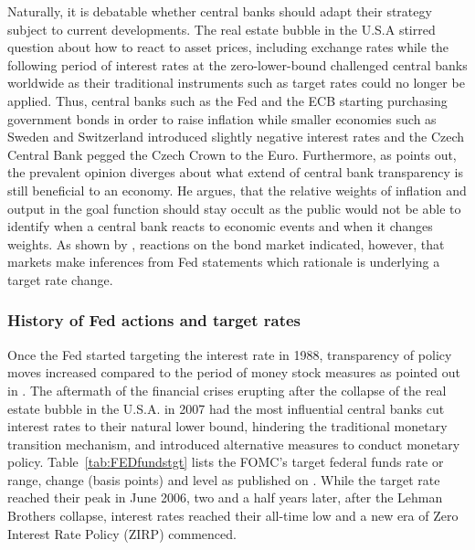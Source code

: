 Naturally, it is debatable whether central banks should adapt their strategy subject to current developments. The real estate bubble in the U.S.A stirred question about how to react to asset prices, including exchange rates while the following period of interest rates at the zero-lower-bound challenged central banks worldwide as their traditional instruments such as target rates could no longer be applied. Thus, central banks such as the Fed and the ECB starting purchasing government bonds in order to raise inflation while smaller economies such as Sweden and Switzerland introduced slightly negative interest rates and the Czech Central Bank pegged the Czech Crown to the Euro. Furthermore, as \textcite{Mishkin.2007} points out, the prevalent opinion diverges about what extend of central bank transparency is still beneficial to an economy. He argues, that the relative weights of inflation and output in the goal function should stay occult as the public would not be able to identify when a central bank reacts to economic events and when it changes weights. As shown by \textcite{Ellingsen.2001}, reactions on the bond market indicated, however, that markets make inferences from Fed statements which rationale is underlying a target rate change. %


\subsubsection{History of Fed actions and target rates}

Once the Fed started targeting the interest rate in 1988, transparency of policy moves increased compared to the period of money stock measures as pointed out in \textcite{Ellingsen.2003}. The aftermath of the financial crises erupting after the collapse of the real estate bubble in the U.S.A. in 2007 had the most influential central banks cut interest rates to their natural lower bound, hindering the traditional monetary transition mechanism, and introduced alternative measures to conduct monetary policy. Table~\vref{tab:FEDfundstgt} lists the FOMC's target federal funds rate or range, change (basis points) and level as published on \textcite{Fed.OMOs}. While the target rate reached their peak in June 2006, two and a half years later, after the Lehman Brothers collapse, interest rates reached their all-time low and a new era of Zero Interest Rate Policy (ZIRP) commenced.

